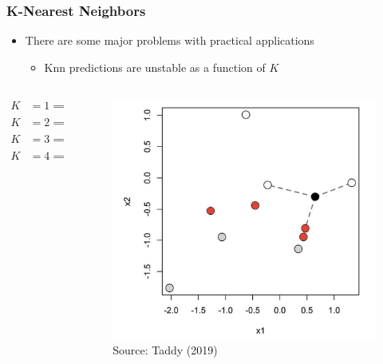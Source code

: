 \documentclass[
  shownotes,
  xcolor={svgnames},
  hyperref={colorlinks,citecolor=DarkBlue,linkcolor=DarkRed,urlcolor=DarkBlue}
  , aspectratio=169]{beamer}
\begin{document}
\begin{frame}[fragile]
\frametitle{K-Nearest Neighbors}
\begin{itemize}
  \item There are some major problems with practical applications
  \medskip
  \begin{itemize}
  \item Knn predictions are unstable as a function of $K$
    \end{itemize}
\end{itemize}
  \begin{columns}[T] %
\begin{column}{.58\textwidth}
\begin{align}
  K&=1 \implies \hat{p}(white)=0 \nonumber \\
  K&=2 \implies \hat{p}(white)=1/2 \nonumber \\
  K&=3 \implies \hat{p}(white)=2/3 \nonumber \\
  K&=4 \implies \hat{p}(white)=1/2 \nonumber 
  \end{align}


\end{column}
\hfill
\begin{column}{.4\textwidth}
\begin{figure}[H] \centering
            \captionsetup{justification=centering}
              \includegraphics[scale=0.1]{figures/knn}
              \\
              \tiny
              Source: Taddy (2019)
 \end{figure}
\end{column}
\end{columns}
  
\end{frame}
\end{document}
